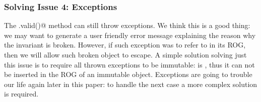 \subsubsection*{Solving Issue 4: Exceptions}
\saveSpace
The \Q@.valid()@ method can still throw exceptions.
We think this is a good thing: we may want to generate a user friendly error message explaining the reason why the invariant is broken.
However, if such exception was to refer to \Q@this@ in its ROG, then we will allow such broken object to escape.
A simple solution solving just this issue is to require all thrown exceptions to be immutable:
\Q@this@ is \Q@read@, thus it can not be inserted in the ROG of an immutable object.
Exceptions are going to trouble our life again later in this paper:
to handle the next case a more complex solution is required.




